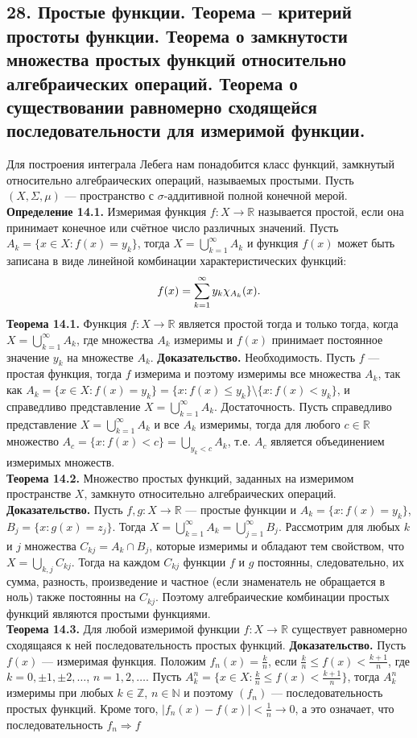 \documentclass[12pt]{article}
\begin{document}
\subsection*{28. Простые функции. Теорема – критерий простоты функции. Теорема о замкнутости
множества простых функций относительно алгебраических операций. Теорема о
существовании равномерно сходящейся последовательности для измеримой
функции.}
Для построения интеграла Лебега нам понадобится класс функций, замкнутый относительно алгебраических операций, называемых простыми. Пусть $(X,\Sigma,\mu)$ — пространство с $\sigma$-аддитивной полной конечной мерой. \\\textbf{Определение 14.1.} Измеримая функция $f:X\to\mathbb{R}$ называется простой, если она принимает конечное или счётное число различных значений. Пусть $A_k=\{x\in X:f(x)=y_k\}$, тогда $X=\bigcup_{k=1}^\infty A_k$ и функция $f(x)$ может быть записана в виде линейной комбинации характеристических функций: \[ f(x)=\sum_{k=1}^\infty y_k\chi_{A_k}(x).\\ \] \textbf{Теорема 14.1.} Функция $f:X\to\mathbb{R}$ является простой тогда и только тогда, когда $X=\bigcup_{k=1}^\infty A_k$, где множества $A_k$ измеримы и $f(x)$ принимает постоянное значение $y_k$ на множестве $A_k$. \textbf{Доказательство.} Необходимость. Пусть $f$ — простая функция, тогда $f$ измерима и поэтому измеримы все множества $A_k$, так как $A_k=\{x\in X:f(x)=y_k\}=\{x:f(x)\leq y_k\}\setminus\{x:f(x)<y_k\}$, и справедливо представление $X=\bigcup_{k=1}^\infty A_k$. Достаточность. Пусть справедливо представление $X=\bigcup_{k=1}^\infty A_k$ и все $A_k$ измеримы, тогда для любого $c\in\mathbb{R}$ множество $A_c=\{x:f(x)<c\}=\bigcup_{y_k<c}A_k$, т.е. $A_c$ является объединением измеримых множеств.\\ \textbf{Теорема 14.2.} Множество простых функций, заданных на измеримом пространстве $X$, замкнуто относительно алгебраических операций. \textbf{Доказательство.} Пусть $f,g:X\to\mathbb{R}$ — простые функции и $A_k=\{x:f(x)=y_k\}$, $B_j=\{x:g(x)=z_j\}$. Тогда $X=\bigcup_{k=1}^\infty A_k=\bigcup_{j=1}^\infty B_j$. Рассмотрим для любых $k$ и $j$ множества $C_{kj}=A_k\cap B_j$, которые измеримы и обладают тем свойством, что $X=\bigcup_{k,j}C_{kj}$. Тогда на каждом $C_{kj}$ функции $f$ и $g$ постоянны, следовательно, их сумма, разность, произведение и частное (если знаменатель не обращается в ноль) также постоянны на $C_{kj}$. Поэтому алгебраические комбинации простых функций являются простыми функциями. \\\textbf{Теорема 14.3.} Для любой измеримой функции $f:X\to\mathbb{R}$ существует равномерно сходящаяся к ней последовательность простых функций. \textbf{Доказательство.} Пусть $f(x)$ — измеримая функция. Положим $f_n(x)=\tfrac{k}{n}$, если $\tfrac{k}{n}\leq f(x)<\tfrac{k+1}{n}$, где $k=0,\pm1,\pm2,\dots$, $n=1,2,\dots$. Пусть $A^n_k=\{x\in X:\tfrac{k}{n}\leq f(x)<\tfrac{k+1}{n}\}$, тогда $A^n_k$ измеримы при любых $k\in\mathbb{Z}$, $n\in\mathbb{N}$ и поэтому $(f_n)$ — последовательность простых функций. Кроме того, $|f_n(x)-f(x)|<\tfrac{1}{n}\to 0$, а это означает, что последовательность $f_n\Rightarrow f$
\end{document}
